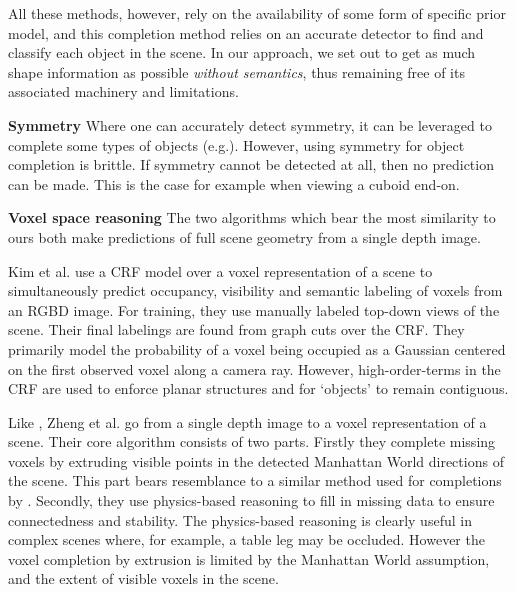 \documentclass[10pt,twocolumn,letterpaper]{article}
\makeatletter
\renewcommand*{\eg}{e.g.\@\xspace}
\newcommand*{\ea}{et al.\@\xspace}
\renewcommand{\paragraph}{\vspace{2pt}\noindent\textbf}
\makeatother
\begin{document}
All these methods, however, rely on the availability of some form of specific prior model, and this completion method relies on an accurate detector to find and classify each object in the scene.
In our approach, we set out to get as much shape information as possible \emph{without semantics}, thus remaining free of its associated machinery and limitations.



\paragraph{Symmetry}
Where one can accurately detect symmetry, it can be leveraged to complete some types of objects (\eg \cite{law-cviu-2010, thrun-iccv-2005, kroemer-humanoids-2012}). 
However, using symmetry for object completion is brittle.
If symmetry cannot be detected at all, then no prediction can be made.
This is the case for example when viewing a cuboid end-on.


\paragraph{Voxel space reasoning}
The two algorithms which bear the most similarity to ours both make predictions of full scene geometry from a single depth image.

Kim \ea \cite{kim-iccv-2013} use a CRF model over a voxel representation of a scene to simultaneously predict occupancy, visibility and semantic labeling of voxels from an RGBD image. 
For training, they use manually labeled top-down views of the scene.
Their final labelings are found from graph cuts over the CRF.
They primarily model the probability of a voxel being occupied as a Gaussian centered on the first observed voxel along a camera ray.
However, high-order-terms in the CRF are used to enforce planar structures and for `objects' to remain contiguous.

Like \cite{kim-iccv-2013},  Zheng \ea \cite{zheng-cvpr-2013} go from a single depth image to a voxel representation of a scene.
Their core algorithm consists of two parts.
Firstly they complete missing voxels by extruding visible points in the detected Manhattan World directions of the scene.
This part bears resemblance to a similar method used for completions by \cite{kroemer-humanoids-2012}.
Secondly, they use physics-based reasoning to fill in missing data to ensure connectedness and stability.
The physics-based reasoning is clearly useful in complex scenes where, for example, a table leg may be occluded.
However the voxel completion by extrusion is limited by the Manhattan World assumption, and the extent of visible voxels in the scene.
\end{document}
